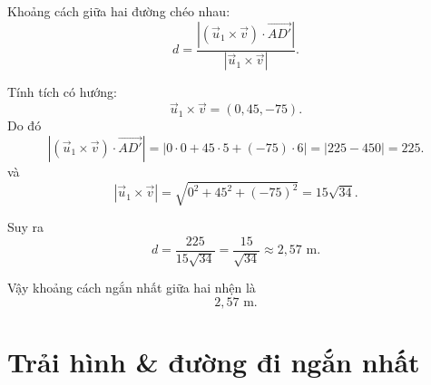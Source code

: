 \begin{loigiai}
Khoảng cách giữa hai đường chéo nhau:
\[
d=\frac{\left|(\vec u_1\times \vec v)\cdot \overrightarrow{AD'}\right|}
{\left|\vec u_1\times \vec v\right|}.
\]

Tính tích có hướng:
\[
\vec u_1\times \vec v=(0,45,-75).
\]
Do đó
\[
\left|(\vec u_1\times \vec v)\cdot \overrightarrow{AD'}\right|
=|0\cdot0+45\cdot5+(-75)\cdot6|
=|225-450|=225.
\]
và
\[
\left|\vec u_1\times \vec v\right|
=\sqrt{0^2+45^2+(-75)^2}
=15\sqrt{34}.
\]

Suy ra
\[
d=\frac{225}{15\sqrt{34}}=\frac{15}{\sqrt{34}}\approx 2{,}57\text{ m}.
\]

Vậy khoảng cách ngắn nhất giữa hai nhện là
\[
\boxed{2{,}57\text{ m}}.
\]
\end{loigiai}

\separator

\section{Trải hình \& đường đi ngắn nhất}

